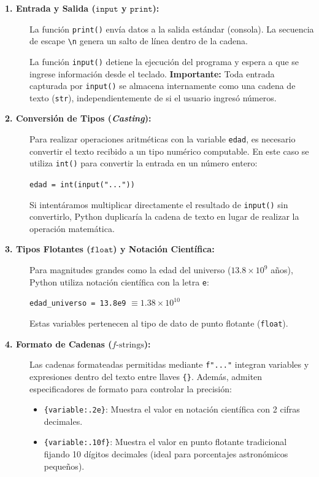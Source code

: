 \documentclass[12pt]{article}
\begin{document}
\begin{description}
    \item[\textbf{1. Entrada y Salida ($\mathtt{input}$ y $\mathtt{print}$):}] 
    La función \lstinline|print()| envía datos a la salida estándar (consola).
    La secuencia de escape \lstinline|\n| genera un salto de línea dentro de la cadena.
    
    La función \lstinline|input()| detiene la ejecución del programa y espera a que se ingrese información 
    desde el teclado. \textbf{Importante:} Toda entrada capturada por \lstinline|input()| se almacena
     internamente como una cadena de texto (\lstinline|str|), independientemente de si el usuario ingresó 
     números.

    \item[\textbf{2. Conversión de Tipos (\textit{Casting}):}] 
    Para realizar operaciones aritméticas con la variable \lstinline|edad|, es necesario convertir el 
    texto recibido a un tipo numérico computable. En este caso se utiliza \lstinline|int()| 
    para convertir la entrada en un número entero:
    \begin{center}
        \lstinline|edad = int(input("..."))|
    \end{center}
    Si intentáramos multiplicar directamente el resultado de \lstinline|input()| sin convertirlo, 
    Python duplicaría la cadena de texto en lugar de realizar la operación matemática.

    \item[\textbf{3. Tipos Flotantes ($\mathtt{float}$) y Notación Científica:}] 
    Para magnitudes grandes como la edad del universo ($13.8 \times 10^9$ años), 
    Python utiliza notación científica con la letra \lstinline|e|:
    \begin{center}
        \lstinline|edad_universo = 13.8e9| \quad $\equiv 1.38 \times 10^{10}$
    \end{center}
    Estas variables pertenecen al tipo de dato de punto flotante (\lstinline|float|).

    \item[\textbf{4. Formato de Cadenas ($f\text{-strings}$):}] 
    Las cadenas formateadas permitidas mediante \lstinline|f"..."| integran variables 
    y expresiones dentro del texto entre llaves \lstinline|{}|. Además, admiten 
    especificadores de formato para controlar la precisión:
    \begin{itemize}
        \item \lstinline|{variable:.2e}|: Muestra el valor en notación científica con 2 cifras decimales.
        \item \lstinline|{variable:.10f}|: Muestra el valor en punto flotante tradicional fijando 
        10 dígitos decimales (ideal para porcentajes astronómicos pequeños).
    \end{itemize}


\end{description}
\end{document}
